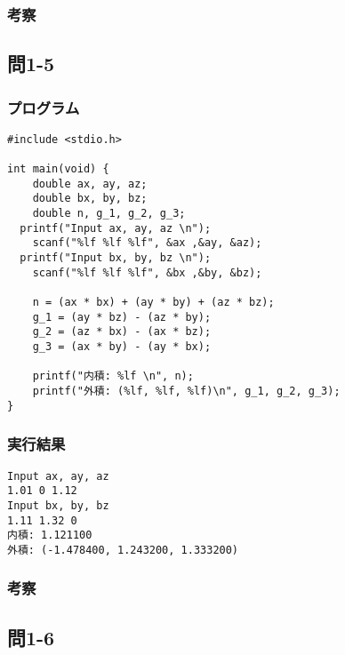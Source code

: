 \documentclass{jarticle}
\begin{document}
\subsubsection{考察\\}


\subsection{問1-5\\}
\subsubsection{プログラム\\}
\begin{breakbox}
\begin{verbatim}
#include <stdio.h>

int main(void) {
	double ax, ay, az;
	double bx, by, bz;
	double n, g_1, g_2, g_3;
  printf("Input ax, ay, az \n");
	scanf("%lf %lf %lf", &ax ,&ay, &az);
  printf("Input bx, by, bz \n");
	scanf("%lf %lf %lf", &bx ,&by, &bz);
  
	n = (ax * bx) + (ay * by) + (az * bz); 
	g_1 = (ay * bz) - (az * by); 
	g_2 = (az * bx) - (ax * bz); 
	g_3 = (ax * by) - (ay * bx);

	printf("内積: %lf \n", n);
	printf("外積: (%lf, %lf, %lf)\n", g_1, g_2, g_3); 
}
\end{verbatim}
\end{breakbox}
\subsubsection{実行結果\\}
\begin{breakbox}
\begin{verbatim}
Input ax, ay, az 
1.01 0 1.12
Input bx, by, bz 
1.11 1.32 0
内積: 1.121100 
外積: (-1.478400, 1.243200, 1.333200)
\end{verbatim}
\end{breakbox}
\subsubsection{考察\\}

\subsection{問1-6\\}
\end{document}
